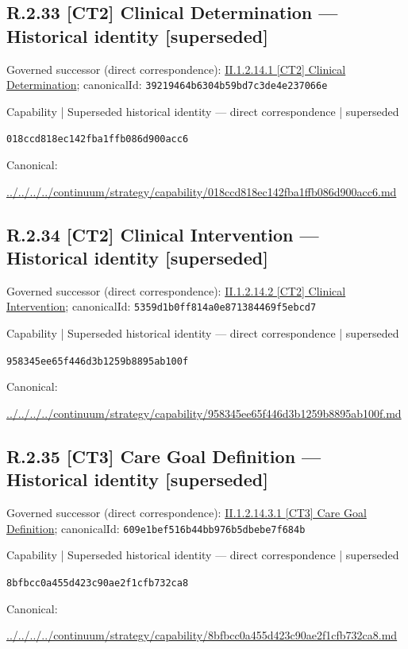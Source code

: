 \documentclass[10pt,a4paper]{article}
\begin{document}
\subsection*{R.2.33 [CT2] Clinical Determination — Historical identity [superseded]}
Governed successor (direct correspondence): \hyperref[element-39219464b6304b59bd7c3de4e237066e]{II.1.2.14.1 [CT2] Clinical Determination}; canonicalId: \texttt{39219464b6304b59bd7c3de4e237066e}\par
\label{element-018ccd818ec142fba1ffb086d900acc6}
{\small Capability | Superseded historical identity — direct correspondence | superseded}\par
\texttt{018ccd818ec142fba1ffb086d900acc6}\par
Canonical: \par
{\footnotesize\url{../../../../continuum/strategy/capability/018ccd818ec142fba1ffb086d900acc6.md}}\par
\subsection*{R.2.34 [CT2] Clinical Intervention — Historical identity [superseded]}
Governed successor (direct correspondence): \hyperref[element-5359d1b0ff814a0e871384469f5ebcd7]{II.1.2.14.2 [CT2] Clinical Intervention}; canonicalId: \texttt{5359d1b0ff814a0e871384469f5ebcd7}\par
\label{element-958345ee65f446d3b1259b8895ab100f}
{\small Capability | Superseded historical identity — direct correspondence | superseded}\par
\texttt{958345ee65f446d3b1259b8895ab100f}\par
Canonical: \par
{\footnotesize\url{../../../../continuum/strategy/capability/958345ee65f446d3b1259b8895ab100f.md}}\par
\subsection*{R.2.35 [CT3] Care Goal Definition — Historical identity [superseded]}
Governed successor (direct correspondence): \hyperref[element-609e1bef516b44bb976b5dbebe7f684b]{II.1.2.14.3.1 [CT3] Care Goal Definition}; canonicalId: \texttt{609e1bef516b44bb976b5dbebe7f684b}\par
\label{element-8bfbcc0a455d423c90ae2f1cfb732ca8}
{\small Capability | Superseded historical identity — direct correspondence | superseded}\par
\texttt{8bfbcc0a455d423c90ae2f1cfb732ca8}\par
Canonical: \par
{\footnotesize\url{../../../../continuum/strategy/capability/8bfbcc0a455d423c90ae2f1cfb732ca8.md}}\par
\end{document}

